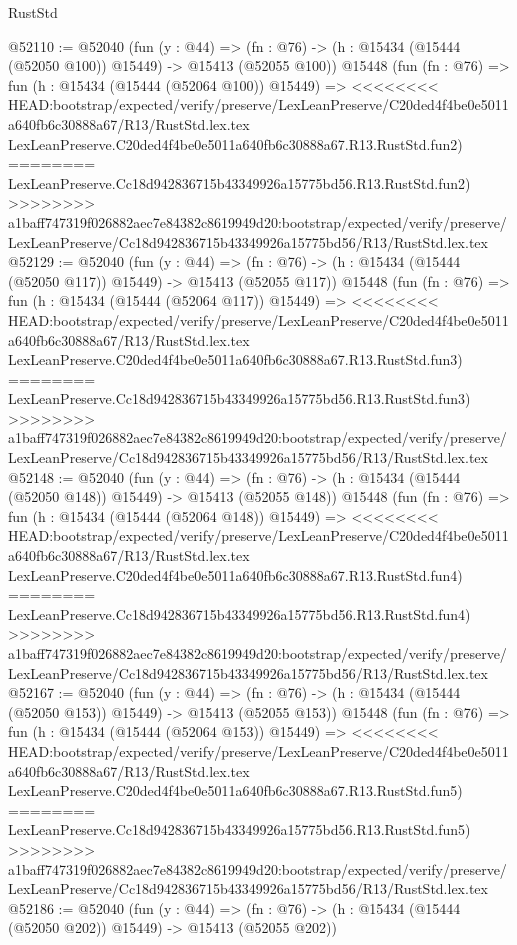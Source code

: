 \begin{lexlean}{RustStd}
\begin{coremodule}
{\begin{coremodule}
{{{{{{{{{{{{{{{{{{{{{{{{{{{{{{{{{{{{{{{{{{{{{{{{{{{{{{{{{{{{@52110 := @52040
    (fun (y : @44) =>
    (fn : @76) -> (h : @15434 (@15444 (@52050 @100)) @15449) -> @15413 (@52055 @100))
    @15448
    (fun (fn : @76) =>
    fun (h : @15434 (@15444 (@52064 @100)) @15449) =>
<<<<<<<< HEAD:bootstrap/expected/verify/preserve/LexLeanPreserve/C20ded4f4be0e5011a640fb6c30888a67/R13/RustStd.lex.tex
    LexLeanPreserve.C20ded4f4be0e5011a640fb6c30888a67.R13.RustStd.fun2)
========
    LexLeanPreserve.Cc18d942836715b43349926a15775bd56.R13.RustStd.fun2)
>>>>>>>> a1baff747319f026882aec7e84382c8619949d20:bootstrap/expected/verify/preserve/LexLeanPreserve/Cc18d942836715b43349926a15775bd56/R13/RustStd.lex.tex
@52129 := @52040
    (fun (y : @44) =>
    (fn : @76) -> (h : @15434 (@15444 (@52050 @117)) @15449) -> @15413 (@52055 @117))
    @15448
    (fun (fn : @76) =>
    fun (h : @15434 (@15444 (@52064 @117)) @15449) =>
<<<<<<<< HEAD:bootstrap/expected/verify/preserve/LexLeanPreserve/C20ded4f4be0e5011a640fb6c30888a67/R13/RustStd.lex.tex
    LexLeanPreserve.C20ded4f4be0e5011a640fb6c30888a67.R13.RustStd.fun3)
========
    LexLeanPreserve.Cc18d942836715b43349926a15775bd56.R13.RustStd.fun3)
>>>>>>>> a1baff747319f026882aec7e84382c8619949d20:bootstrap/expected/verify/preserve/LexLeanPreserve/Cc18d942836715b43349926a15775bd56/R13/RustStd.lex.tex
@52148 := @52040
    (fun (y : @44) =>
    (fn : @76) -> (h : @15434 (@15444 (@52050 @148)) @15449) -> @15413 (@52055 @148))
    @15448
    (fun (fn : @76) =>
    fun (h : @15434 (@15444 (@52064 @148)) @15449) =>
<<<<<<<< HEAD:bootstrap/expected/verify/preserve/LexLeanPreserve/C20ded4f4be0e5011a640fb6c30888a67/R13/RustStd.lex.tex
    LexLeanPreserve.C20ded4f4be0e5011a640fb6c30888a67.R13.RustStd.fun4)
========
    LexLeanPreserve.Cc18d942836715b43349926a15775bd56.R13.RustStd.fun4)
>>>>>>>> a1baff747319f026882aec7e84382c8619949d20:bootstrap/expected/verify/preserve/LexLeanPreserve/Cc18d942836715b43349926a15775bd56/R13/RustStd.lex.tex
@52167 := @52040
    (fun (y : @44) =>
    (fn : @76) -> (h : @15434 (@15444 (@52050 @153)) @15449) -> @15413 (@52055 @153))
    @15448
    (fun (fn : @76) =>
    fun (h : @15434 (@15444 (@52064 @153)) @15449) =>
<<<<<<<< HEAD:bootstrap/expected/verify/preserve/LexLeanPreserve/C20ded4f4be0e5011a640fb6c30888a67/R13/RustStd.lex.tex
    LexLeanPreserve.C20ded4f4be0e5011a640fb6c30888a67.R13.RustStd.fun5)
========
    LexLeanPreserve.Cc18d942836715b43349926a15775bd56.R13.RustStd.fun5)
>>>>>>>> a1baff747319f026882aec7e84382c8619949d20:bootstrap/expected/verify/preserve/LexLeanPreserve/Cc18d942836715b43349926a15775bd56/R13/RustStd.lex.tex
@52186 := @52040
    (fun (y : @44) =>
    (fn : @76) -> (h : @15434 (@15444 (@52050 @202)) @15449) -> @15413 (@52055 @202))
}}}}}}}}}}}}}}}}}}}}}}}}}}}}}}}}}}}}}}}}}}}}}}}}}}}}}}}}}}}}
\end{coremodule}}
\end{coremodule}
\end{lexlean}
